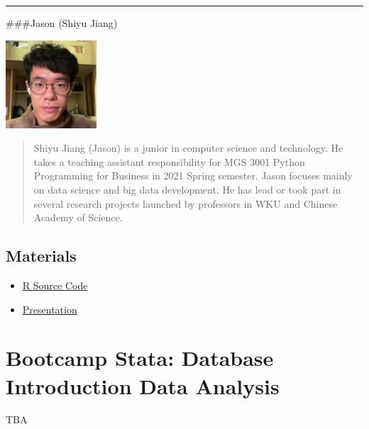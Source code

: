 \documentclass[
]{book}
\providecommand{\tightlist}{%
  \setlength{\itemsep}{0pt}\setlength{\parskip}{0pt}}
\begin{document}
\begin{center}\rule{0.5\linewidth}{0.5pt}\end{center}

\#\#\#Jason (Shiyu Jiang)

\includegraphics{image/ta_ja.png}

\begin{quote}
Shiyu Jiang (Jason) is a junior in computer science and technology. He takes a teaching assistant responsibility for MGS 3001 Python Programming for Business in 2021 Spring semester. Jason focuses mainly on data science and big data development. He has lead or took part in several research projects launched by professors in WKU and Chinese Academy of Science.
\end{quote}

\hypertarget{materials}{%
\section{Materials}\label{materials}}

\begin{itemize}
\tightlist
\item
  \href{https://github.com/chadchae/ws_ba_bootcamp_2021/blob/master/products/snabootcamp.R}{R Source Code}
\item
  \href{https://github.com/chadchae/ws_ba_bootcamp_2021/blob/master/products/snabootcamp.pdf}{Presentation}
\end{itemize}

\hypertarget{bootcamp-stata-database-introduction-data-analysis}{%
\chapter{Bootcamp Stata: Database Introduction Data Analysis}\label{bootcamp-stata-database-introduction-data-analysis}}

TBA
\end{document}
